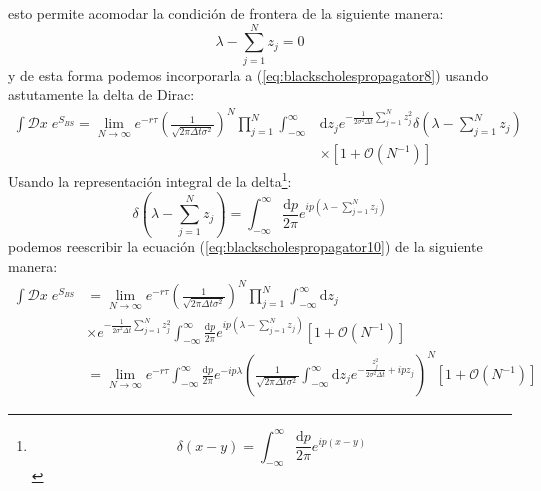 \documentclass[11pt,a4paper]{article}
\begin{document}
esto permite acomodar la condici\'on de frontera de la siguiente manera:
\begin{equation}
\lambda - \sum_{j = 1}^N z_j = 0
\label{eq:boundarycondition3}
\end{equation}
y de esta forma podemos incorporarla a (\ref{eq:blackscholespropagator8}) usando astutamente la delta de Dirac:
\begin{equation}
\begin{split}
\int\mathcal{D}x \; e^{S_{BS}} = \lim_{N\rightarrow \infty}e^{-r\tau}\left(\frac{1}{\sqrt{2\pi\Delta t\sigma^2}}\right)^N \prod_{j = 1}^N \int_{-\infty}^\infty & \mathrm{d}z_j e^{-\frac{1}{2\sigma^2\Delta t}\sum_{j=1}^Nz_j^2}\delta \left( \lambda - \sum_{j = 1}^N z_j \right) \\
& \times \left[ 1 + \mathcal{O} \left( N^{-1} \right) \right]
\end{split}
\label{eq:blackscholespropagator9}
\end{equation}
Usando la representaci\'on integral de la delta\footnote{
\begin{equation}
\delta(x-y) = \int_{-\infty}^{\infty}\frac{\mathrm{d}p}{2\pi}e^{ip(x-y)}
\label{eq:deltaintegralrepresentation1}
\end{equation}
}:
\begin{equation}
\delta\left( \lambda - \sum_{j = 1}^N z_j \right) = \int_{-\infty}^{\infty}\frac{\mathrm{d}p}{2\pi}e^{ip\left( \lambda - \sum_{j = 1}^N z_j \right)}
\label{eq:deltaintegralrepresentation2}
\end{equation}
podemos reescribir la ecuaci\'on (\ref{eq:blackscholespropagator10}) de la siguiente manera:
\begin{equation}
\begin{split}
\int\mathcal{D}x \; e^{S_{BS}} & = \lim_{N\rightarrow \infty}e^{-r\tau}\left(\frac{1}{\sqrt{2\pi\Delta t\sigma^2}}\right)^N \prod_{j = 1}^N \int_{-\infty}^\infty \mathrm{d}z_j \\ & \times e^{-\frac{1}{2\sigma^2\Delta t}\sum_{j=1}^Nz_j^2} \int_{-\infty}^{\infty}\frac{\mathrm{d}p}{2\pi}e^{ip\left( \lambda - \sum_{j = 1}^N z_j \right)} \left[ 1 + \mathcal{O} \left( N^{-1} \right) \right] \\
& = \lim_{N\rightarrow \infty}e^{-r\tau} \int_{-\infty}^{\infty}\frac{\mathrm{d}p}{2\pi}  e^{-ip\lambda} \left( \frac{1}{\sqrt{2\pi\Delta t\sigma^2}}\int_{-\infty}^\infty \mathrm{d}z_j e^{-\frac{z_j^2}{2\sigma^2\Delta t} + ipz_j} \right)^N   \left[ 1 + \mathcal{O} \left( N^{-1} \right) \right]
\end{split}
\label{eq:blackscholespropagator10}
\end{equation}
\end{document}
